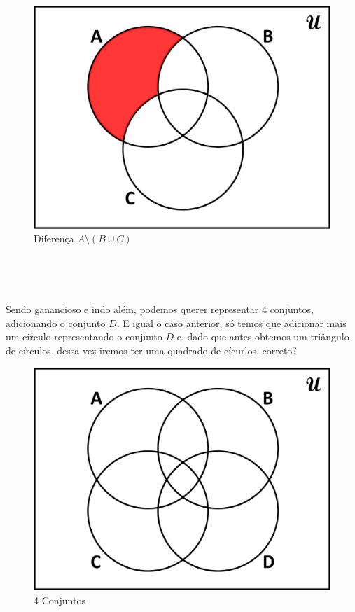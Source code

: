 \begin{figure}[ht!]
  \centering
  \includegraphics[scale=0.3]{figures/sets/fig_sets_03_13.pdf}
  \caption{Diferença $A \setminus (B \cup C)$}
  \label{fig:sets_03_13}
\end{figure}

\newpage

$\qquad$

$\qquad$

Sendo ganancioso e indo além, podemos querer representar $4$ conjuntos, adicionando o conjunto $D$. E igual o caso anterior, só temos que adicionar mais um círculo representando o conjunto $D$ e, dado que antes obtemos um triângulo de círculos, dessa vez iremos ter uma quadrado de cícurlos, correto?

\begin{figure}[h!]
  \centering
  \includegraphics[scale=0.3]{figures/sets/fig_sets_03_14.pdf}
  \caption{4 Conjuntos}
  \label{fig:sets_03_14}
\end{figure}

